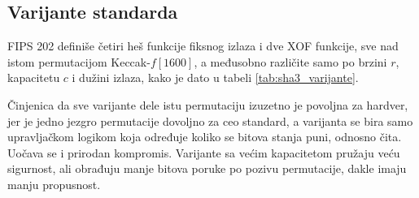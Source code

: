 \subsection{Varijante standarda}
\label{subsec:sha3_varijante}

FIPS 202 definiše četiri heš funkcije fiksnog izlaza i dve XOF funkcije, sve nad istom permutacijom Keccak-$f[1600]$, a međusobno različite samo po brzini $r$, kapacitetu $c$ i dužini izlaza, kako je dato u tabeli \ref{tab:sha3_varijante}.

\begin{table}[H]
\caption[Varijante SHA-3 standarda]{Varijante SHA-3 standarda \cite{fips202}}
\centering
{}
\label{tab:sha3_varijante}
\end{table}

Činjenica da sve varijante dele istu permutaciju izuzetno je povoljna za hardver, jer je jedno jezgro permutacije dovoljno za ceo standard, a varijanta se bira samo upravljačkom logikom koja određuje koliko se bitova stanja puni, odnosno čita. Uočava se i prirodan kompromis. Varijante sa većim kapacitetom pružaju veću sigurnost, ali obrađuju manje bitova poruke po pozivu permutacije, dakle imaju manju propusnost.

